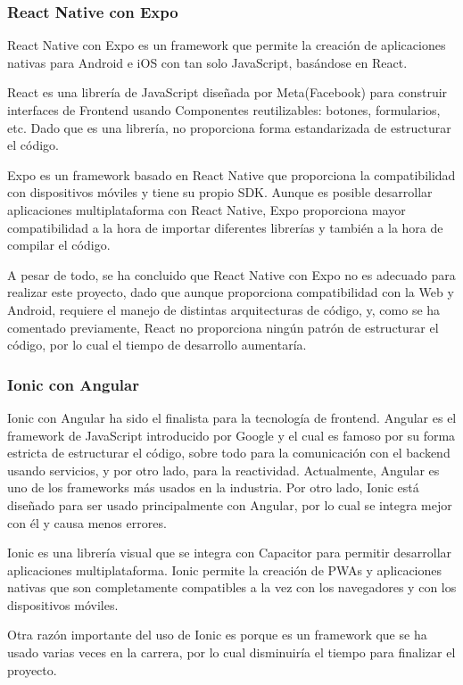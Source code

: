 \subsubsection{React Native con Expo}
React Native con Expo es un framework que permite la creación de aplicaciones nativas para Android e iOS con tan solo JavaScript, basándose en React. 
\par React es una librería de JavaScript diseñada por Meta(Facebook) para construir interfaces de Frontend usando Componentes reutilizables: botones, formularios, etc. Dado que es una librería, no proporciona forma estandarizada de estructurar el código. \citep{react}
\par Expo es un framework basado en React Native que proporciona la compatibilidad con dispositivos móviles y tiene su propio SDK. Aunque es posible desarrollar aplicaciones multiplataforma con React Native, Expo proporciona mayor compatibilidad a la hora de importar diferentes librerías y también a la hora de compilar el código.
\par A pesar de todo, se ha concluido que React Native con Expo no es adecuado para realizar este proyecto, dado que aunque proporciona compatibilidad con la Web y Android, requiere el manejo de distintas arquitecturas de código, y, como se ha comentado previamente, React no proporciona ningún patrón de estructurar el código, por lo cual el tiempo de desarrollo aumentaría.
\subsubsection{Ionic con Angular}
Ionic con Angular ha sido el finalista para la tecnología de frontend. Angular es el framework de JavaScript introducido por Google y el cual es famoso por su forma estricta de estructurar el código, sobre todo para la comunicación con el backend usando servicios, y por otro lado, para la reactividad. Actualmente, Angular es uno de los frameworks más usados en la industria. Por otro lado, Ionic está diseñado para ser usado principalmente con Angular, por lo cual se integra mejor con él y causa menos errores.
\par Ionic es una librería visual que se integra con Capacitor para permitir desarrollar aplicaciones multiplataforma. Ionic permite la creación de PWAs y aplicaciones nativas que son completamente compatibles a la vez con los navegadores y con los dispositivos móviles. \citep{ionic}
\par Otra razón importante del uso de Ionic es porque es un framework que se ha usado varias veces en la carrera, por lo cual disminuiría el tiempo para finalizar el proyecto.
